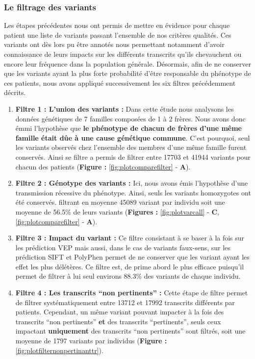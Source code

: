 \documentclass[12pt,twoside]{reedthesis}
\theoremstyle{definition}
\theoremstyle{definition}
\theoremstyle{remark}
\begin{document}
  \subsubsection{Le filtrage des
  variants}\label{le-filtrage-des-variants-1}
  
  Les étapes précédentes nous ont permis de mettre en évidence pour chaque
  patient une liste de variants passant l'ensemble de nos critères
  qualités. Ces variants ont dès lors pu être annotés nous permettant
  notamment d'avoir connaissance de leurs impacts sur les différents
  transcrits qu'ils chevauchent ou encore leur fréquence dans la
  population générale. Désormais, afin de ne conserver que les variants
  ayant la plus forte probabilité d'être responsable du phénotype de ces
  patients, nous avons appliqué successivement les six filtres
  précédemment décrits.
  
  \begin{enumerate}
  \def\labelenumi{\arabic{enumi}.}
  \item
    \textbf{Filtre 1 : L'union des variants :} Dans cette étude nous
    analysons les données génétiques de 7 familles composées de 1 à 2
    frères. Nous avons donc émmi l'hypothèse que \textbf{le phénotype de
    chacun de frères d'une même famille était dûe à une cause génétique
    commune}. C'est pourquoi, seul les variants observés chez l'ensemble
    des membres d'une même famille furent conservés. Ainsi se filtre a
    permis de filtrer entre 17703 et 41944 variants pour chacun des
    patients (\textbf{Figure : }\ref{fig:plotcomparefilter} - \textbf{A}).
  \item
    \textbf{Filtre 2 : Génotype des variants :} Ici, nous avons émis
    l'hypothèse d'une transmission récessive du phénotype. Ainsi, seuls
    les variants homozygotes ont été conservés. filtrant en moyenne 45089
    variant par individu soit une moyenne de 56.5\% de leurs variants
    (\textbf{Figures : }\ref{fig:plotvarcall} - \textbf{C},
    \ref{fig:plotcomparefilter} - \textbf{A}).
  \item
    \textbf{Filtre 3 : Impact du variant :} Ce filtre consistant à se
    baser à la fois sur les prédiction VEP mais aussi, dans le cas de
    variants faux-sens, sur les prédiction SIFT et PolyPhen permet de ne
    conserver que les variant ayant les effet les plus délétères. Ce
    filtre est, de prime abord le plus efficace puisqu'il permet de
    filtrer à lui seul environs 88.3\% des variants de chaque individu.
  \item
    \textbf{Filtre 4 : Les transcrits ``non pertinents'' :} Cette étape de
    filtre permet de filtrer systématiquement entre 13712 et 17992
    transcrits différents par patients. Cependant, un même variant pouvant
    impacter à la fois des transcrits ``non pertinents'' \textbf{et} des
    transcrits ``pertinents'', seuls ceux impactant \textbf{uniquement}
    des transcrits ``non pertinents'' sont filtrés, soit une moyenne de
    1797 variants par individus (\textbf{Figure :
    }\ref{fig:plotfilternonpertinanttr}).
  \end{enumerate}
  
\end{document}
